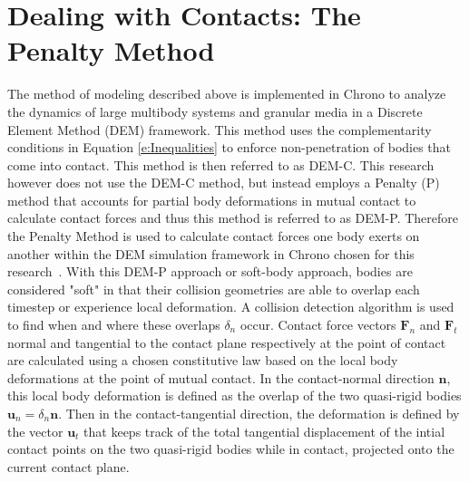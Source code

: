 \documentclass[12pt,onecolumn]{report}
\begin{document}

\section{Dealing with Contacts: The Penalty Method}\label{s:Penalty}

The method of modeling described above is implemented in Chrono to analyze the dynamics of large multibody systems and granular media in a Discrete Element Method (DEM) framework. This method uses the complementarity conditions in Equation \ref{e:Inequalities} to enforce non-penetration of bodies that come into  contact. This method is then referred to as DEM-C. This research however does not use the DEM-C method, but instead employs a Penalty (P) method that accounts for partial body deformations in mutual contact to calculate contact forces and thus this method is referred to as DEM-P. Therefore the Penalty Method is used to calculate contact forces one body exerts on another within the DEM simulation framework in Chrono chosen for this research~\cite{Chrono2016}. With this DEM-P approach or soft-body approach, bodies are considered "soft" in that their collision geometries are able to overlap each timestep or experience local deformation. A collision detection algorithm is used to find when and where these overlaps $\delta_n$ occur. Contact force vectors $\boldsymbol{F}_n$ and $\boldsymbol{F}_t$ normal and tangential to the contact plane respectively at the point of contact are calculated using a chosen constitutive law based on the local body deformations at the point of mutual contact. In the contact-normal direction $\boldsymbol{n}$, this local body deformation is defined as the overlap of the two quasi-rigid bodies $\boldsymbol{u}_n = \delta_n\boldsymbol{n}$. Then in the contact-tangential direction, the deformation is defined by the vector $\boldsymbol{u}_t$ that keeps track of the total tangential displacement of the intial contact points on the two quasi-rigid bodies while in contact, projected onto the current contact plane. 
\end{document}
